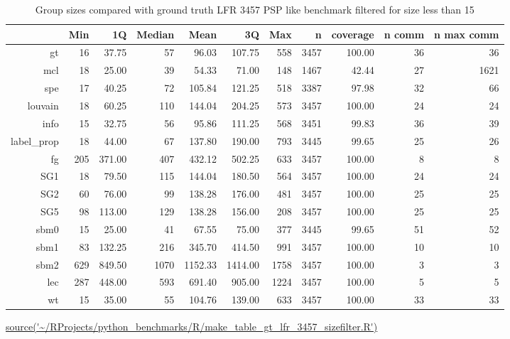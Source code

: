 \begin{table}[ht]
\centering
\begin{adjustbox}{width=\textwidth}

\setlength{\extrarowheight}{2pt}
\begin{tabular}{rrrrrrrrrrr}
  \toprule
 & Min & 1Q & Median & Mean & 3Q & Max & n & coverage & n comm &  n max comm \\ 
  \midrule
gt & 16 & 37.75 & 57 & 96.03 & 107.75 & 558 & 3457 & 100.00 & 36 & 36 \\ 
  mcl & 18 & 25.00 & 39 & 54.33 & 71.00 & 148 & 1467 & 42.44 & 27 & 1621 \\ 
  spe & 17 & 40.25 & 72 & 105.84 & 121.25 & 518 & 3387 & 97.98 & 32 & 66 \\ 
  louvain & 18 & 60.25 & 110 & 144.04 & 204.25 & 573 & 3457 & 100.00 & 24 & 24 \\ 
  info & 15 & 32.75 & 56 & 95.86 & 111.25 & 568 & 3451 & 99.83 & 36 & 39 \\ 
  label\_prop & 18 & 44.00 & 67 & 137.80 & 190.00 & 793 & 3445 & 99.65 & 25 & 26 \\ 
  fg & 205 & 371.00 & 407 & 432.12 & 502.25 & 633 & 3457 & 100.00 & 8 & 8 \\ 
  SG1 & 18 & 79.50 & 115 & 144.04 & 180.50 & 564 & 3457 & 100.00 & 24 & 24 \\ 
  SG2 & 60 & 76.00 & 99 & 138.28 & 176.00 & 481 & 3457 & 100.00 & 25 & 25 \\ 
  SG5 & 98 & 113.00 & 129 & 138.28 & 156.00 & 208 & 3457 & 100.00 & 25 & 25 \\ 
  sbm0 & 15 & 25.00 & 41 & 67.55 & 75.00 & 377 & 3445 & 99.65 & 51 & 52 \\ 
  sbm1 & 83 & 132.25 & 216 & 345.70 & 414.50 & 991 & 3457 & 100.00 & 10 & 10 \\ 
  sbm2 & 629 & 849.50 & 1070 & 1152.33 & 1414.00 & 1758 & 3457 & 100.00 & 3 & 3 \\ 
  lec & 287 & 448.00 & 593 & 691.40 & 905.00 & 1224 & 3457 & 100.00 & 5 & 5 \\ 
  wt & 15 & 35.00 & 55 & 104.76 & 139.00 & 633 & 3457 & 100.00 & 33 & 33 \\ 
   \bottomrule
\end{tabular}
\end{adjustbox}
\caption{Group sizes compared with ground truth LFR 3457 PSP like benchmark filtered for size less than 15} 
\tiny\url{source('~/RProjects/python_benchmarks/R/make_table_gt_lfr_3457_sizefilter.R')}
\label{tab:Group sizes compared with ground truth LFR 3457 PSP like benchmark filtered for size less than 15}
\end{table}




